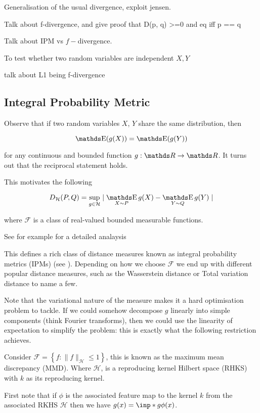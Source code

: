 Generalisation of the usual divergence, exploit jensen.

Talk about f-divergence, and give proof that D(p, q) >=0 and eq iff p == q

Talk about IPM vs $f-$divergence. 

To test whether two random variables are independent $X, Y$

talk about L1 being f-divergence


\subsection{Integral Probability Metric}

Observe that if two random variables $X$, $Y$ share the same distribution, then 

$$
\E(g(X)) = \E(g(Y))
$$

for any continuous and bounded function $g : \R \rightarrow \R$. 
It turns out that the reciprocal statement holds.

This motivates the following 

$$
D_\mathcal{H} (P, Q) = 
\sup _{g \in \mathcal{H}} \mid \mathop{\E}_{X \sim P} g(X) - \mathop{\E}_{Y \sim Q} g(Y) \mid
$$

where $\mathcal{F}$ is a class of real-valued bounded measurable functions.

See for example \cite{sriperumbudur2009integral} for a detailed analaysis

This defines a rich class of distance measures known as 
integral probability metrics (IPMs) (see \cite{muller1997integral}). Depending
on how we choose $\mathcal{F}$ we end up with different popular distance measures, such as
the Wasserstein distance or Total variation distance to name a few. 

Note that the variational nature of the measure makes it a hard optimisation problem to tackle.
If we could somehow decompose $g$ linearly into simple components (think Fourier transforms), 
then we could use the linearity of expectation to simplify the problem: this is exactly what
the following restriction achieves.

Consider $\mathcal{F}=\left\{f:\|f\|_{\mathcal{H}} \leq 1\right\}$, this is known
as the maximum mean discrepancy (MMD). Where $\mathcal{H}$, is a reproducing kernel Hilbert space 
(RHKS) with $k$ as its reproducing kernel. 

First note that if $\phi$ is the associated feature map to the kernel $k$ from the associated 
RKHS $\mathcal{H}$ then we have $g(x) = \inp*{g}{\phi(x)} $.

